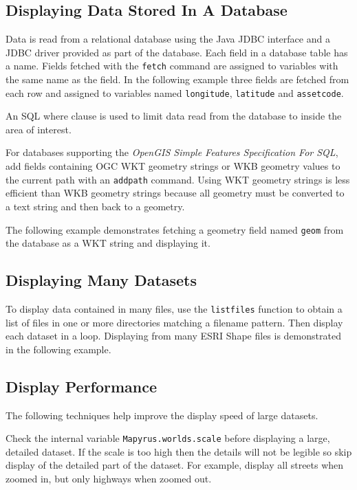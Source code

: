 \subsection{Displaying Data Stored In A Database}

Data is read from a relational database using
the Java JDBC interface and a JDBC driver provided
as part of the database.
Each field in a database table has a name.
Fields fetched with the
\texttt{fetch}
command are assigned to variables with the same name as the field.
In the following example three fields are fetched from each
row and assigned to variables named
\texttt{longitude}, \texttt{latitude} and \texttt{assetcode}.

An SQL where clause is used to limit data read from
the database to inside the area of interest.



For databases supporting the \textit{OpenGIS Simple Features Specification For
SQL}, add fields containing OGC WKT geometry strings or WKB geometry values
to the current path with an \texttt{addpath} command.  Using WKT geometry
strings is less efficient than WKB geometry strings because all geometry
must be converted to a text string and then back to a geometry.

The following example demonstrates fetching a geometry field named \texttt{geom}
from the database as a WKT string and displaying it.



\subsection{Displaying Many Datasets}

To display data contained in many files, use the \texttt{listfiles}
function to obtain a list of files in one or more directories matching
a filename pattern.  Then display each dataset in a loop.
Displaying from many ESRI Shape files is demonstrated in the following
example.



\subsection{Display Performance}

The following techniques help improve the display speed of large datasets.

Check the internal variable \texttt{Mapyrus.worlds.scale} before displaying a
large, detailed dataset.  If the scale is too high then the details will not be
legible so skip display of the detailed part of the dataset.  For example,
display all streets when zoomed in, but only highways when zoomed out.

